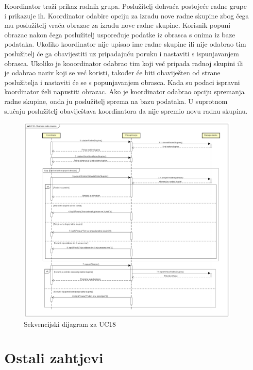 				\par Koordinator traži prikaz radnih grupa. Poslužitelj dohvaća postojeće radne grupe i prikazuje ih. Koordinator  odabire opciju za izradu nove radne skupine zbog čega mu poslužitelj vraća obrazac za izradu nove radne skupine. Korisnik popuni obrazac nakon čega poslužitelj uspoređuje podatke iz obrasca s onima iz baze podataka. Ukoliko koordinator nije upisao ime radne skupine ili nije odabrao tim poslužitelj će ga obavijestiti uz pripadajuću poruku i nastaviti s ispunjavanjem obrasca. Ukoliko je kooordinator odabrao tim koji već pripada radnoj skupini ili je odabrao naziv koji se već koristi, također će biti obaviješten od strane poslužitelja i nastaviti će se s popunjavanjem obrasca. Kada su podaci ispravni koordinator želi napustiti obrazac. Ako je koordinator odabrao opciju spremanja radne skupine, onda ju poslužitelj sprema na bazu podataka. U suprotnom slučaju poslužitelj obaviještava koordinatora da nije spremio novu radnu skupinu.
				\begin{figure}[h]
					\includegraphics[width=\textwidth]{slike/Sekvencijski_UC18.png}
					\caption{Sekvencijski dijagram za UC18}
					\end{figure}
				\eject
				
		\pagebreak
		\newpage	
		\section{Ostali zahtjevi}
		
